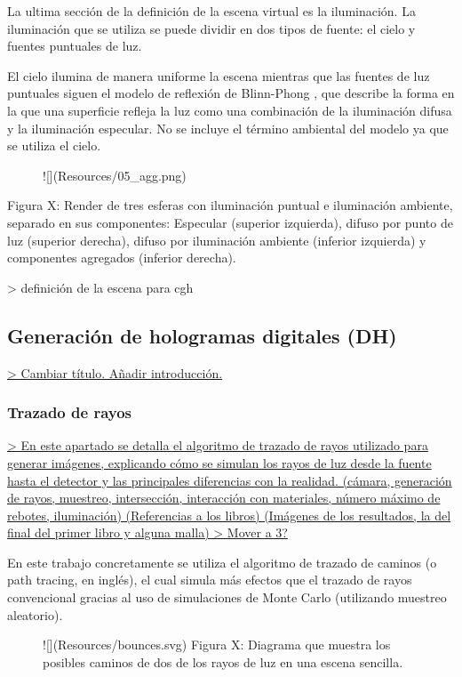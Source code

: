 \documentclass[10pt, a4paper]{article}
\begin{document}
La ultima sección de la definición de la escena virtual es la iluminación. La iluminación que se utiliza se puede dividir en dos tipos de fuente: el cielo y fuentes puntuales de luz.

El cielo ilumina de manera uniforme la escena mientras que las fuentes de luz puntuales siguen el modelo de reflexión de Blinn-Phong \cite{Blinn:1977}, que describe la forma en la que una superficie refleja la luz como una combinación de la iluminación difusa y la iluminación especular. No se incluye el término ambiental del modelo ya que se utiliza el cielo.


\begin{figure}[h] 
![](Resources/05_agg.png)
\end{figure}

Figura X: Render de tres esferas con iluminación puntual e iluminación ambiente, separado en sus componentes: Especular (superior izquierda), difuso por punto de luz (superior derecha), difuso por iluminación ambiente (inferior izquierda) y componentes agregados (inferior derecha).

> definición de la escena para cgh

\subsection{Generación de hologramas digitales (DH)}

\underline{> Cambiar título. Añadir introducción.}

\subsubsection{Trazado de rayos}

\underline{> En este apartado se detalla el algoritmo de trazado de rayos utilizado para generar imágenes, explicando cómo se simulan los rayos de luz desde la fuente hasta el detector y las principales diferencias con la realidad. (cámara, generación de rayos, muestreo, intersección, interacción con materiales, número máximo de rebotes, iluminación) (Referencias a los libros) (Imágenes de los resultados, la del final del primer libro y alguna malla)
> Mover a 3?}

En este trabajo concretamente se utiliza el algoritmo de trazado de caminos (o path tracing, en inglés), el cual simula más efectos que el trazado de rayos convencional gracias al uso de simulaciones de Monte Carlo (utilizando muestreo aleatorio).

\begin{figure}[h] 
![](Resources/bounces.svg)
Figura X: Diagrama que muestra los posibles caminos de dos de los rayos de luz en una escena sencilla.
\end{figure}
\end{document}

